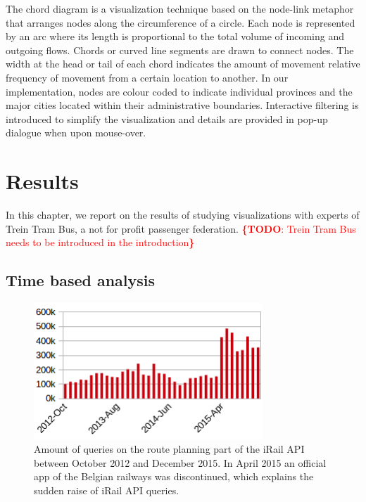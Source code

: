 \documentclass{sig-alternate}
\newcommand{\todo}[1]{\noindent\textcolor{red}{{\bf \{TODO}: #1{\bf \}}}}
\begin{document}
The chord diagram is a visualization technique based on the node-link metaphor that arranges nodes along the circumference of a circle. 
Each node is represented by an arc where its length is proportional to the total volume of incoming and outgoing flows. 
Chords or curved line segments are drawn to connect nodes. 
The width at the head or tail of each chord indicates the amount of movement relative frequency of movement from a certain location to another. 
In our implementation, nodes are colour coded to indicate individual provinces and the major cities located within their administrative boundaries. 
Interactive filtering is introduced to simplify the visualization and details are provided in pop-up dialogue when upon mouse-over.

\section{Results}
\label{sec:results}

In this chapter, we report on the results of studying visualizations with experts of Trein Tram Bus, a not for profit passenger federation. \todo{Trein Tram Bus needs to be introduced in the introduction}

\subsection{Time based analysis}

\begin{figure}
\centering
\includegraphics[width=8.6cm]{querylogs}
\caption{Amount of queries on the route planning part of the iRail API between October 2012 and December 2015. In April 2015 an official app of the Belgian railways was discontinued, which explains the sudden raise of iRail API queries.}
\label{fig:querylogs}
\end{figure}
\end{document}
